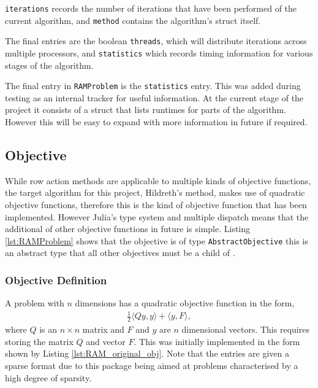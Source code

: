 

\texttt{iterations} records the number of iterations that have been performed of the current algorithm, and \texttt{method} contains the algorithm's struct itself.

The final entries are the boolean \texttt{threads}, which will distribute iterations across multiple processors, and \texttt{statistics} which records timing information for various stages of the algorithm. 

The final entry in \texttt{RAMProblem} is the \texttt{statistics} entry. This was added during testing as an internal tracker for useful information. At the current stage of the project it consists of a struct that lists runtimes for parts of the algorithm. However this will be easy to expand with more information in future if required.


\subsection{Objective} \label{sub:obj_ram_des}
While row action methods are applicable to multiple kinds of objective functions, the target algorithm for this project, Hildreth's method, makes use of quadratic objective functions, therefore this is the kind of objective function that has been implemented. However Julia's type system and multiple dispatch means that the additional of other objective functions in future is simple. Listing \ref{lst:RAMProblem} shows that the objective is of type \texttt{AbstractObjective} this is an abstract type that all other objectives must be a child of .

\subsubsection{Objective Definition}\label{subsub:ram_objective}

A problem with $n$ dimensions has a quadratic objective function in the form,
\begin{gather}
    \frac{1}{2}\langle Qy,y \rangle + \langle y,F \rangle,
\end{gather}
where $Q$ is an $n\times n$ matrix and $F$ and $y$ are $n$ dimensional vectors. This requires storing the matrix $Q$ and vector $F$. This was initially implemented in the form shown by Listing \ref{lst:RAM_original_obj}. Note that the entries are given a sparse format due to this package being aimed at problems characterised by a high degree of sparsity.

